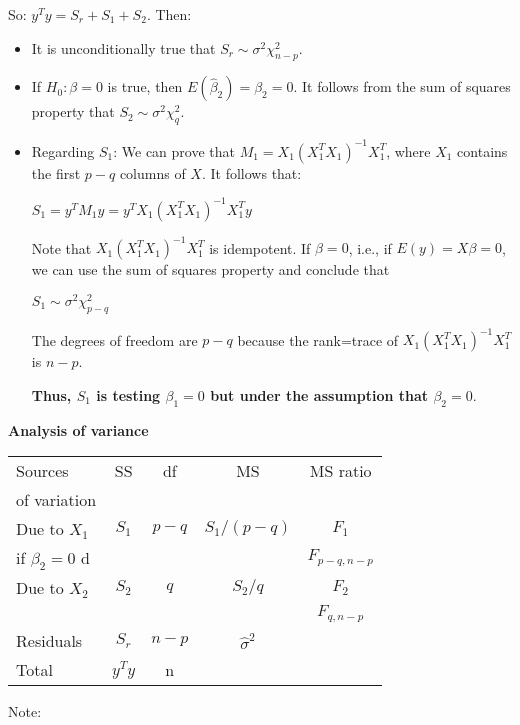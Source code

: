 \documentclass[10pt,landscape]{article}
\begin{document}
\begin{multicols}{3}
So: $y^T y = S_r + S_1 + S_2$.  Then:

\begin{itemize}
\item It is unconditionally true that $S_r \sim \sigma^2 \chi^2_{n-p}$.
\item If $H_0: \beta=0$ is true, then $E(\hat{\beta}_2) = \beta_2 = 0$. It follows from the sum of squares property that $S_2 \sim \sigma^2 \chi_q^2$.  
\item Regarding $S_1$: 
We can prove that $M_1 = X_1 (X_1^T X_1)^{-1}X_1^T$, where $X_1$ contains the first $p-q$ columns of $X$. It follows that:

$S_1 = y^T M_1 y =y^T X_1 (X_1^T X_1)^{-1}X_1^T  y$

Note that $X_1 (X_1^T X_1)^{-1}X_1^T$ is idempotent. If $\beta=0$, i.e., if $E(y) =X\beta = 0$, we can use the  sum of squares property and conclude that

$S_1 \sim \sigma^2 \chi_{p-q}^2$

The degrees of freedom are $p-q$ because the rank=trace of  $X_1 (X_1^T X_1)^{-1}X_1^T$ is $n-p$.

\textbf{Thus, $S_1$ is testing $\beta_1=0$ but under the assumption that $\beta_2=0$}.

\end{itemize}

\textbf{Analysis of variance}

\begin{tabular}{|l|c|c|c|c|}
\hline
Sources & SS & df & MS & MS ratio\\
 of variation & & & & \\
\hline
Due to $X_1$  & $S_1$ & $p-q$ & $S_1/(p-q)$ & $F_1$ \\
if $\beta_2=0$   d& & & & $F_{p-q,n-p}$\\
\hline
Due to $X_2$ & $S_2$ & $q$ & $S_2/q$ & $F_2$\\
& & & &  $F_{q,n-p}$\\
\hline
Residuals   & $S_r$ & $n-p$ & $\hat{\sigma}^2$ & \\
\hline
Total           & $y^T y$  & n &  &\\
\hline
\end{tabular}

Note:


\end{multicols}
\end{document}
